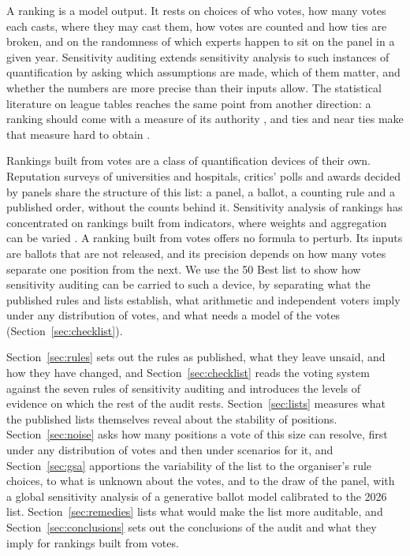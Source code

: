 \documentclass[11pt,a4paper]{article}
\begin{document}
A ranking is a model output. It rests on choices of who votes, how many votes each casts, where they may cast them, how votes are counted and how ties are broken, and on the randomness of which experts happen to sit on the panel in a given year. Sensitivity auditing \citep{saltelli2013latinorum,lopiano2022unpacking} extends sensitivity analysis to such instances of quantification by asking which assumptions are made, which of them matter, and whether the numbers are more precise than their inputs allow. The statistical literature on league tables reaches the same point from another direction: a ranking should come with a measure of its authority \citep{goldstein1996,hall2009}, and ties and near ties make that measure hard to obtain \citep{xie2009}.

Rankings built from votes are a class of quantification devices of their own. Reputation surveys of universities and hospitals, critics' polls and awards decided by panels share the structure of this list: a panel, a ballot, a counting rule and a published order, without the counts behind it. Sensitivity analysis of rankings has concentrated on rankings built from indicators, where weights and aggregation can be varied \citep{saisana2005,saisana2011}. A ranking built from votes offers no formula to perturb. Its inputs are ballots that are not released, and its precision depends on how many votes separate one position from the next. We use the 50 Best list to show how sensitivity auditing can be carried to such a device, by separating what the published rules and lists establish, what arithmetic and independent voters imply under any distribution of votes, and what needs a model of the votes (Section~\ref{sec:checklist}).

Section~\ref{sec:rules} sets out the rules as published, what they leave unsaid, and how they have changed, and Section~\ref{sec:checklist} reads the voting system against the seven rules of sensitivity auditing and introduces the levels of evidence on which the rest of the audit rests. Section~\ref{sec:lists} measures what the published lists themselves reveal about the stability of positions. Section~\ref{sec:noise} asks how many positions a vote of this size can resolve, first under any distribution of votes and then under scenarios for it, and Section~\ref{sec:gsa} apportions the variability of the list to the organiser's rule choices, to what is unknown about the votes, and to the draw of the panel, with a global sensitivity analysis of a generative ballot model calibrated to the 2026 list. Section~\ref{sec:remedies} lists what would make the list more auditable, and Section~\ref{sec:conclusions} sets out the conclusions of the audit and what they imply for rankings built from votes.
\end{document}
